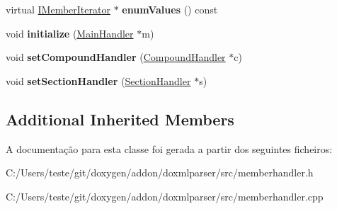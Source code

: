 \begin{DoxyCompactItemize}
\item 
\hypertarget{class_member_handler_a4c312258bdcba4e3e7c582316ed96495}{virtual \hyperlink{class_i_member_iterator}{I\-Member\-Iterator} $\ast$ {\bfseries enum\-Values} () const }\label{class_member_handler_a4c312258bdcba4e3e7c582316ed96495}

\item 
\hypertarget{class_member_handler_ae0b91c6d4aea68cbf73c2d19d03a247c}{void {\bfseries initialize} (\hyperlink{class_main_handler}{Main\-Handler} $\ast$m)}\label{class_member_handler_ae0b91c6d4aea68cbf73c2d19d03a247c}

\item 
\hypertarget{class_member_handler_aef2ce94622ad38d172b7bb8922bb9d07}{void {\bfseries set\-Compound\-Handler} (\hyperlink{class_compound_handler}{Compound\-Handler} $\ast$c)}\label{class_member_handler_aef2ce94622ad38d172b7bb8922bb9d07}

\item 
\hypertarget{class_member_handler_ab46c08d79000afea9f1920453991cdf1}{void {\bfseries set\-Section\-Handler} (\hyperlink{class_section_handler}{Section\-Handler} $\ast$s)}\label{class_member_handler_ab46c08d79000afea9f1920453991cdf1}

\end{DoxyCompactItemize}
\subsection*{Additional Inherited Members}


A documentação para esta classe foi gerada a partir dos seguintes ficheiros\-:\begin{DoxyCompactItemize}
\item 
C\-:/\-Users/teste/git/doxygen/addon/doxmlparser/src/memberhandler.\-h\item 
C\-:/\-Users/teste/git/doxygen/addon/doxmlparser/src/memberhandler.\-cpp\end{DoxyCompactItemize}
